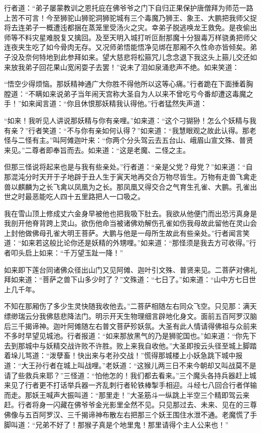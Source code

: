 \documentclass[12pt,UTF8]{ctexbook}
\begin{document}
{	行者道：“弟子屡蒙教训之恩托庇在佛爷爷之门下自归正果保护唐僧拜为师范一路上苦不可言！今至狮驼山狮驼洞狮驼城有三个毒魔乃狮王、象王、大鹏把我师父捉将去连弟子一概遭迍都捆在蒸笼里受汤火之灾。幸弟子脱逃唤龙王救免。是夜偷出师等不料灾星难脱复又擒回。及至天明入城打听叵耐那魔十分狠毒万样骁勇把师父连夜夹生吃了如今骨肉无存。又况师弟悟能悟净见绑在那厢不久性命亦皆倾矣。弟子没及奈何特地到此参拜如来。望大慈悲将松箍咒儿念念退下我这头上箍儿交还如来放我弟子回花果山宽闲耍子去罢！”说未了泪如泉涌悲声不绝。如来笑道：
	
	“悟空少得烦恼。那妖精神通广大你胜不得他所以这等心痛。”行者跪在下面捶着胸膛道：“不瞒如来说弟子当年闹天宫称大圣自为人以来不曾吃亏今番却遭这毒魔之手！”如来闻言道：“你且休恨那妖精我认得他。”行者猛然失声道：
	
	“如来！我听见人讲说那妖精与你有亲哩。”如来道：“这个刁猢狲！怎么个妖精与我有亲？”行者笑道：“不与你有亲如何认得？”如来道：“我慧眼观之故此认得。那老怪与二怪有主。”叫阿傩迦叶来：“你两个分头驾云去五台山、峨眉山宣文殊、普贤来见。”二尊者即奉旨而去。如来道：“这是老魔、二怪之主。
	
	但那三怪说将起来也是与我有些亲处。”行者道：“亲是父党？母党？”如来道：“自那混沌分时天开于子地辟于丑人生于寅天地再交合万物尽皆生。万物有走兽飞禽走兽以麒麟为之长飞禽以凤凰为之长。那凤凰又得交合之气育生孔雀、大鹏。孔雀出世之时最恶能吃人四十五里路把人一口吸之。
	
	我在雪山顶上修成丈六金身早被他也把我吸下肚去。我欲从他便门而出恐污真身是我剖开他脊背跨上灵山。欲伤他命当被诸佛劝解伤孔雀如伤我母故此留他在灵山会上封他做佛母孔雀大明王菩萨。大鹏与他是一母所生故此有些亲处。”行者闻言笑道：“如来若这般比论你还是妖精的外甥哩。”如来道：“那怪须是我去方可收得。”行者叩头启上如来：“千万望玉趾一降！”
	
	如来即下莲台同诸佛众径出山门又见阿傩、迦叶引文殊、普贤来见。二菩萨对佛礼拜如来道：“菩萨之兽下山多少时了？”文殊道：“七日了。”如来道：“山中方七日世上几千年。
	
	不知在那厢伤了多少生灵快随我收他去。”二菩萨相随左右同众飞空。只见那：满天缥缈瑞云分我佛慈悲降法门。明示开天生物理细言辟地化身文。面前五百阿罗汉脑后三千揭谛神。迦叶阿傩随左右普文菩萨殄妖氛。大圣有此人情请得佛祖与众前来不多时早望见城池。行者报道：“如来那放黑气的乃是狮驼国也。”如来道：“你先下去到那城中与妖精交战许败不许胜。败上来我自收他。”大圣即按云头径至城上脚踏着垛儿骂道：“泼孽畜！快出来与老孙交战！”慌得那城楼上小妖急跳下城中报道：“大王孙行者在城上叫战哩。”老妖道：“这猴儿两三日不来今朝却又叫战莫不是请了些救兵来耶？”三怪道：“怕他怎的！我们都去看来。”三个魔头各持兵器赶上城来见了行者更不打话举兵器一齐乱刺行者轮铁棒掣手相迎。斗经七八回合行者佯输而走。那妖王喊声大振叫道：“那里走！”大圣筋斗一纵跳上半空三个精即驾云来赶。行者将身一闪藏在佛爷爷金光影里全然不见。只见那过去、未来、见在的三尊佛像与五百阿罗汉、三千揭谛神布散左右把那三个妖王围住水泄不通。老魔慌了手脚叫道：“兄弟不好了！那猴子真是个地里鬼！那里请得个主人公来也！”
	
}
\end{document}
